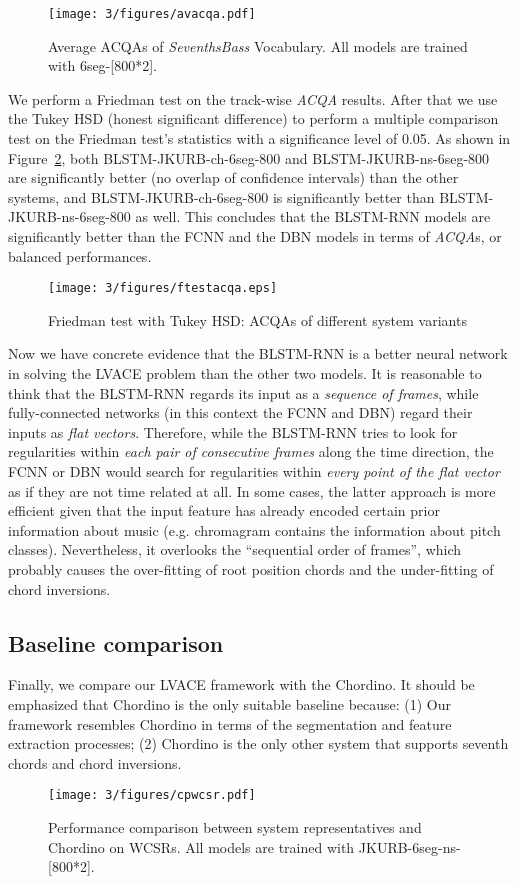 \begin{figure}[h!]
	\centering
	\texttt{[image: 3/figures/avacqa.pdf]}
	\caption{Average ACQAs of \textit{SeventhsBass} Vocabulary. All models are trained with 6seg-[800*2].}
	\label{fig:3-acqa}
\end{figure}
We perform a Friedman test \cite{friedman1937use} on the track-wise \textit{ACQA} results. After that we use the Tukey HSD (honest significant difference) \cite{tukey1949comparing} to perform a multiple comparison test on the Friedman test's statistics with a significance level of 0.05. As shown in Figure~\ref{fig:3-friedmanacqa}, both BLSTM-JKURB-ch-6seg-800 and BLSTM-JKURB-ns-6seg-800 are significantly better (no overlap of confidence intervals) than the other systems, and BLSTM-JKURB-ch-6seg-800 is significantly better than BLSTM-JKURB-ns-6seg-800 as well. This concludes that the BLSTM-RNN models are significantly better than the FCNN and the DBN models in terms of \textit{ACQA}s, or balanced performances.
\begin{figure}[h!]
	\centering
	\texttt{[image: 3/figures/ftestacqa.eps]}
	\caption{Friedman test with Tukey HSD: ACQAs of different system variants}
	\label{fig:3-friedmanacqa}
\end{figure}

Now we have concrete evidence that the BLSTM-RNN is a better neural network in solving the LVACE problem than the other two models. It is reasonable to think that the BLSTM-RNN regards its input as a {\it sequence of frames}, while fully-connected networks (in this context the FCNN and DBN) regard their inputs as \textit{flat vectors}. Therefore, while the BLSTM-RNN tries to look for regularities within \textit{each pair of consecutive frames} along the time direction, the FCNN or DBN would search for regularities within \textit{every point of the flat vector} as if they are not time related at all. In some cases, the latter approach is more efficient given that the input feature has already encoded certain prior information about music (e.g. chromagram contains the information about pitch classes). Nevertheless, it overlooks the ``sequential order of frames'', which probably causes the over-fitting of root position chords and the under-fitting of chord inversions.

\subsection{Baseline comparison} \label{sec:3-p9}
Finally, we compare our LVACE framework with the Chordino. It should be emphasized that Chordino is the only suitable baseline because: (1) Our framework resembles Chordino in terms of the segmentation and feature extraction processes; (2) Chordino is the only other system that supports seventh chords and chord inversions.
\begin{figure}[h!]
	\centering
	\texttt{[image: 3/figures/cpwcsr.pdf]}
	\caption{Performance comparison between system representatives and Chordino on WCSRs. All models are trained with JKURB-6seg-ns-[800*2].}
	\label{fig:3-compchordino}
\end{figure}

